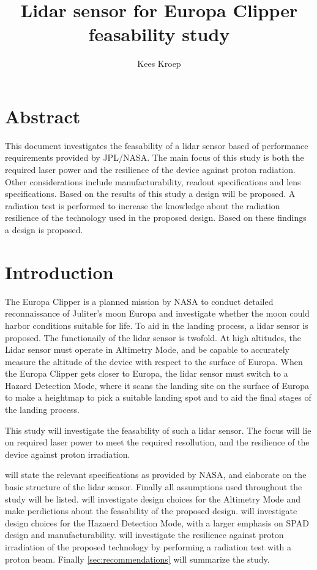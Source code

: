 \documentclass[]{report}
\title{Lidar sensor for Europa Clipper feasability study}
\author{Kees Kroep}
\begin{document}
  \maketitle


\section*{Abstract}
This document investigates the feasability of a lidar sensor based of performance requirements provided by JPL/NASA. The main focus of this study is both the required laser power and the resilience of the device against proton radiation. Other considerations include manufacturability, readout specifications and lens specifications. Based on the results of this study a design will be proposed. A radiation test is performed to increase the knowledge about the radiation resilience of the technology used in the proposed design. Based on these findings a design is proposed.

\tableofcontents
\clearpage

\section*{Introduction}
The Europa Clipper is a planned mission by NASA  to conduct  detailed reconnaissance of Juliter's moon Europa and investigate whether the moon could harbor conditions suitable for life. To aid in the landing process, a lidar sensor is proposed. The functionaily of the lidar sensor is twofold. At high altitudes, the Lidar sensor must operate in Altimetry Mode, and be capable to accurately measure the altitude of the device with respect to the surface of Europa. When the Europa Clipper gets closer to Europa, the lidar sensor must switch to a Hazard Detection Mode, where it scans the landing site on the surface of Europa to make a heightmap to pick a suitable landing spot and to aid the final stages of the landing process.

This study will investigate the feasability of such a lidar sensor. The focus will lie on required laser power to meet the required resollution, and the resilience of the device against proton irradiation. 

 will state the relevant specifications as provided by NASA, and elaborate on the basic structure of the lidar sensor. Finally all assumptions used throughout the study will be listed.  will investigate design choices for the Altimetry Mode and make perdictions about the feasability of the proposed design.  will investigate design choices for the Hazaerd Detection Mode, with a larger emphasis on SPAD design and manufacturability.  will investigate the resilience against proton irradiation of the proposed technology by performing a radiation test with a proton beam. Finally \cref{sec:recommendations} will summarize the study.
\end{document}
